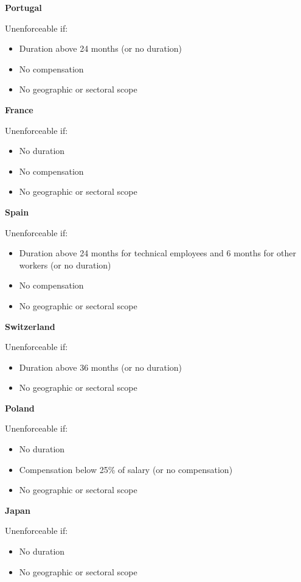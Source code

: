 \documentclass[11pt,a4paper]{article}
\begin{document}
	\textbf{Portugal}

Unenforceable if:
\begin{itemize}
	\item Duration above 24 months (or no duration)
	\item No compensation
	\item No geographic or sectoral scope
\end{itemize}

	\textbf{France}

Unenforceable if:
\begin{itemize}
	\item No duration
	\item No compensation
	\item No geographic or sectoral scope
\end{itemize}

	\textbf{Spain}

Unenforceable if:
\begin{itemize}
	\item Duration above 24 months for technical employees and 6 months for other workers (or no duration)
	\item No compensation
	\item No geographic or sectoral scope
\end{itemize}

	\textbf{Switzerland}

Unenforceable if:
\begin{itemize}
	\item Duration above 36 months (or no duration)
	\item No geographic or sectoral scope
\end{itemize}

	\textbf{Poland}

Unenforceable if:
\begin{itemize}
	\item No duration
	\item Compensation below 25\% of salary (or no compensation)
	\item No geographic or sectoral scope
\end{itemize}

	\textbf{Japan}

Unenforceable if:
\begin{itemize}
	\item No duration
	\item No geographic or sectoral scope
\end{itemize}
\end{document}

